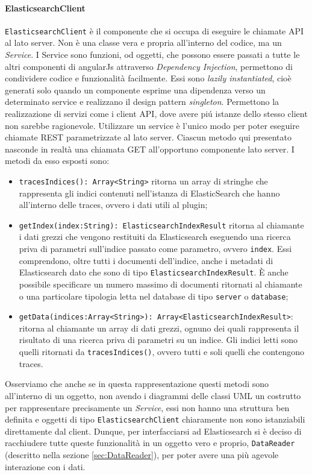 \paragraph{ElasticsearchClient} \Spazio
\texttt{ElasticsearchClient} è il componente che si occupa di eseguire le chiamate API al lato server. Non è una classe vera e propria all'interno del codice, ma un \emph{Service}. 
I Service sono funzioni, od oggetti, che possono essere passati a tutte le altri componenti di angularJs attraverso \emph{Dependency Injection}, permettono di condividere codice e funzionalità facilmente. Essi sono \emph{lazily instantiated}, cioè generati solo quando un componente esprime una dipendenza verso un determinato service e realizzano il design pattern \emph{singleton}. Permettono la realizzazione di servizi come i client API, dove avere piú istanze dello stesso client non sarebbe ragionevole. 
Utilizzare un service è l'unico modo per poter eseguire chiamate REST parametrizzate al lato server. Ciascun metodo qui presentato nasconde in realtà una chiamata GET all'opportuno componente lato server. I metodi da esso esposti sono: 
\begin{itemize} 
  \item \texttt{tracesIndices(): Array<String>} ritorna un array di stringhe che rappresenta gli indici contenuti nell'istanza di ElasticSearch che hanno all'interno delle traces, ovvero i dati utili al plugin; 
  \item \texttt{getIndex(index:String): ElasticsearchIndexResult} ritorna al chiamante i dati grezzi che vengono restituiti da Elasticsearch eseguendo una ricerca priva di parametri sull'indice passato come parametro, ovvero \texttt{index}. Essi comprendono, oltre tutti i documenti dell'indice, anche i metadati di Elasticsearch dato che sono di tipo \texttt{ElasticsearchIndexResult}. È anche possibile specificare un numero massimo di documenti ritornati al chiamante o una particolare tipologia letta nel database di tipo \texttt{server} o \texttt{database}; 
  \item \texttt{getData(indices:Array<String>): Array<ElasticsearchIndexResult>}: ritorna al chiamante un array di dati grezzi, ognuno dei quali rappresenta il risultato di una ricerca priva di parametri su un indice. Gli indici letti sono quelli ritornati da \texttt{tracesIndices()}, ovvero tutti e soli quelli che contengono traces. 
\end{itemize} 
Osserviamo che anche se in questa rappresentazione questi metodi sono all'interno di un oggetto, non avendo i diagrammi delle classi UML un costrutto per rappresentare precisamente un \emph{Service}, essi non hanno una struttura ben definita e oggetti di tipo \texttt{ElasticsearchClient} chiaramente non sono istanziabili direttamente dal client. Dunque, per interfacciarsi ad Elasticsearch si è deciso di racchiudere tutte queste funzionalità in un oggetto vero e proprio, \texttt{DataReader} (descritto nella sezione \ref{sec:DataReader}), per poter avere una più agevole interazione con i dati. 

